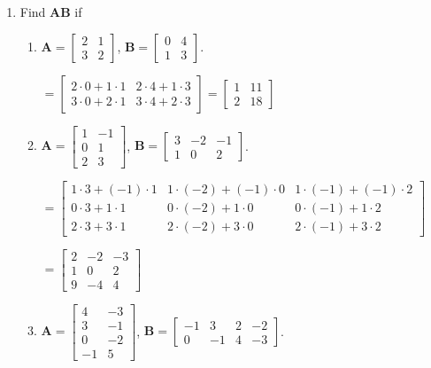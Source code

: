 \documentclass[11pt]{article}
\begin{document}
\begin{enumerate}[label=\textbf{\arabic*.}]
	\item Find \textbf{AB} if
	
	\begin{enumerate}[label=\textbf{\alph*)}]
		\item $\textbf{A} = 
		\begin{bmatrix}
			2 & 1 \\
			3 & 2
		\end{bmatrix}$, $\textbf{B} =
		\begin{bmatrix}
			0 & 4 \\
			1 & 3
		\end{bmatrix}$.
	
		$=
		\begin{bmatrix}
			2 \cdot 0 + 1 \cdot 1 & 2 \cdot 4 + 1 \cdot 3 \\
			3 \cdot 0 + 2 \cdot 1 & 3 \cdot 4 + 2 \cdot 3 
		\end{bmatrix} = 
		\begin{bmatrix}
			1 & 11 \\
			2 & 18
		\end{bmatrix}$
	
		\item $\textbf{A} = 
		\begin{bmatrix}
			1 & -1 \\
			0 & 1 \\
			2 & 3
		\end{bmatrix}$, $\textbf{B} = 
		\begin{bmatrix}
			3 & -2 & -1 \\
			1 & 0 & 2
		\end{bmatrix}$.
	
		$ =
		\begin{bmatrix}
			1 \cdot 3 + (-1) \cdot 1 & 1 \cdot (-2) + (-1) \cdot 0 & 1 \cdot (-1) + (-1) \cdot 2 \\
			0 \cdot 3 + 1 \cdot 1 & 0 \cdot (-2) + 1 \cdot 0 & 0 \cdot (-1) + 1 \cdot 2 \\
			2 \cdot 3 + 3 \cdot 1 & 2 \cdot (-2) + 3 \cdot 0 & 2 \cdot (-1) + 3 \cdot 2
		\end{bmatrix}$
	
		$ = 
		\begin{bmatrix}
			2 & -2 & -3 \\
			1 & 0 & 2 \\
			9 & -4 & 4
		\end{bmatrix}$
	
		\item $\textbf{A} =
		\begin{bmatrix}
			4 & -3 \\
			3 & -1 \\
			0 & -2 \\
			-1 & 5
		\end{bmatrix}$, $\textbf{B} = 
		\begin{bmatrix}
			-1 & 3 & 2 & -2 \\
			0 & -1 & 4 & -3
		\end{bmatrix}$.
	

\end{enumerate}
\end{enumerate}
\end{document}
